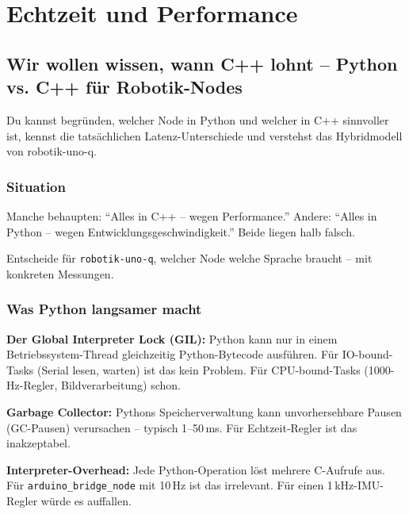 
\part{Echtzeit und Performance}

\chapter{Wir wollen wissen, wann C++ lohnt –
  Python vs. C++ für Robotik-Nodes}

\begin{lernziele}
Du kannst begründen, welcher Node in Python und welcher in C++ sinnvoller ist,
kennst die tatsächlichen Latenz-Unterschiede
und verstehst das Hybridmodell von robotik-uno-q.
\end{lernziele}

\section{Situation}

Manche behaupten: "`Alles in C++ -- wegen Performance."'
Andere: "`Alles in Python -- wegen Entwicklungsgeschwindigkeit."'
Beide liegen halb falsch.

\begin{aufgabeBox}
Entscheide für \texttt{robotik-uno-q}, welcher Node
welche Sprache braucht -- mit konkreten Messungen.
\end{aufgabeBox}

\section{Was Python langsamer macht}

\begin{wissenBox}
\textbf{Der Global Interpreter Lock (GIL):}
Python kann nur in einem Betriebssystem-Thread gleichzeitig
Python-Bytecode ausführen.
Für IO-bound-Tasks (Serial lesen, warten) ist das kein Problem.
Für CPU-bound-Tasks (1000-Hz-Regler, Bildverarbeitung) schon.

\textbf{Garbage Collector:}
Pythons Speicherverwaltung kann unvorhersehbare Pausen
(GC-Pausen) verursachen -- typisch 1--50\,ms.
Für Echtzeit-Regler ist das inakzeptabel.

\textbf{Interpreter-Overhead:}
Jede Python-Operation löst mehrere C-Aufrufe aus.
Für \texttt{arduino\_bridge\_node} mit 10\,Hz ist das irrelevant.
Für einen 1\,kHz-IMU-Regler würde es auffallen.
\end{wissenBox}

